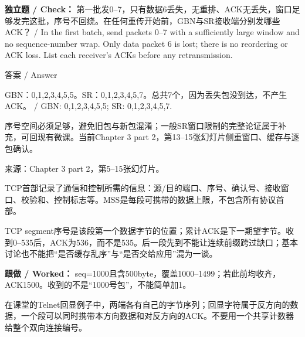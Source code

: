 



\textbf{独立题 / Check：} 第一批发0–7，只有数据6丢失，无重排、ACK无丢失，窗口足够发完这批，序号不回绕。在任何重传开始前，GBN与SR接收端分别发哪些ACK？ / In the first batch, send packets 0–7 with a sufficiently large window and no sequence-number wrap. Only data packet 6 is lost; there is no reordering or ACK loss. List each receiver's ACKs before any retransmission.



\begin{StudySolution}{答案 / Answer}


GBN：0,1,2,3,4,5,5。SR：0,1,2,3,4,5,7。总共7个，因为丢失包没到达，不产生ACK。 / GBN: 0,1,2,3,4,5,5; SR: 0,1,2,3,4,5,7.


\end{StudySolution}


序号空间必须足够，避免旧包与新包混淆；一般SR窗口限制的完整论证属于补充，可回现有微课。当前Chapter 3 part 2，第13–15张幻灯片侧重窗口、缓存与逐包确认。


来源：Chapter 3 part 2，第5–15张幻灯片。








TCP首部记录了通信和控制所需的信息：源/目的端口、序号、确认号、接收窗口、校验和、控制标志等。MSS是每段可携带的数据上限，不包含所有协议首部。


TCP segment序号是该段第一个数据字节的位置；累计ACK是下一期望字节。收到0–535后，ACK为536，而不是535。后一段先到不能让连续前缀跨过缺口；基本讨论也不能把“是否缓存乱序”与“是否交给应用”混为一谈。


\textbf{跟做 / Worked：} seq=1000且含500byte，覆盖1000–1499；若此前均收齐，ACK1500。收到的不是“1000号包”，不能简单加1。





在课堂的Telnet回显例子中，两端各有自己的字节序列；回显字符属于反方向的数据，一个段可以同时携带本方向数据和对反方向的ACK。不要用一个共享计数器给整个双向连接编号。


